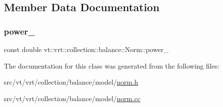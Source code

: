 \subsection{Member Data Documentation}
\mbox{\label{classvt_1_1vrt_1_1collection_1_1balance_1_1_norm_a03090310a3420b16ee581541cb261661}} 
\subsubsection{\texorpdfstring{power\+\_\+}{power\_}}
{\footnotesize\ttfamily const double vt\+::vrt\+::collection\+::balance\+::\+Norm\+::power\+\_\+\hspace{0.3cm}{\ttfamily [private]}}



The documentation for this class was generated from the following files\+:\begin{DoxyCompactItemize}
\item 
src/vt/vrt/collection/balance/model/\hyperlink{norm_8h}{norm.\+h}\item 
src/vt/vrt/collection/balance/model/\hyperlink{norm_8cc}{norm.\+cc}\end{DoxyCompactItemize}
